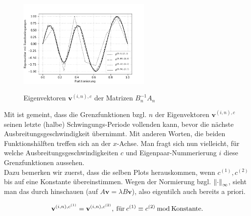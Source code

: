 \begin{figure}[H]
{    \includegraphics[width=65mm]{Aufgabe_2/images/plot_eigen_vectors_general/(2, 3), (3, 2)/plot_eigen_vectors_general(n_array = [8, 16, 32, 64], i = 5, c = (2, 3)).png}
  }
  \hspace{0mm}
  \caption{Eigenvektoren $\mathbf{v}^{(i, n), c}$ der Matrizen $B_n^{-1} A_n$}
  \label{fig:Eigenvektoren_general}
\end{figure}

Mit  ist gemeint, dass die Grenzfunktionen bzgl. $n$ der Eigenvektoren $\mathbf{v}^{(i, n), c}$ seinen letzte (halbe) Schwingungs-Periode vollenden kann, bevor die nächste Ausbreitungsgeschwindigkeit übernimmt. Mit anderen Worten, die beiden Funktionshälften treffen sich an der $x$-Achse. Man fragt sich nun vielleicht, für welche Ausbreitungsgeschwindigkeiten $c$ und Eigenpaar-Nummerierung $i$ diese Grenzfunktionen  aussehen. \\

Dazu bemerken wir zuerst, dass die selben Plots herauskommen, wenn $c^{(1)}, c^{(2)}$ bis auf eine Konstante übereinstimmen. Wegen der Normierung bzgl. $\norm[\infty]{\cdot}$, sieht man das durch hinschauen (auf $A \mathbf{v} = \lambda B \mathbf{v}$), also eigentilch auch bereits a priori.

\begin{align*}
  \mathbf{v}^{(i, n), c^{(1)}} = \mathbf{v}^{(i, n), c^{(2)}}, \:
  \text{für} \:
  c^{(1)} \equiv c^{(2)} \Mod \text{Konstante}.
\end{align*}

